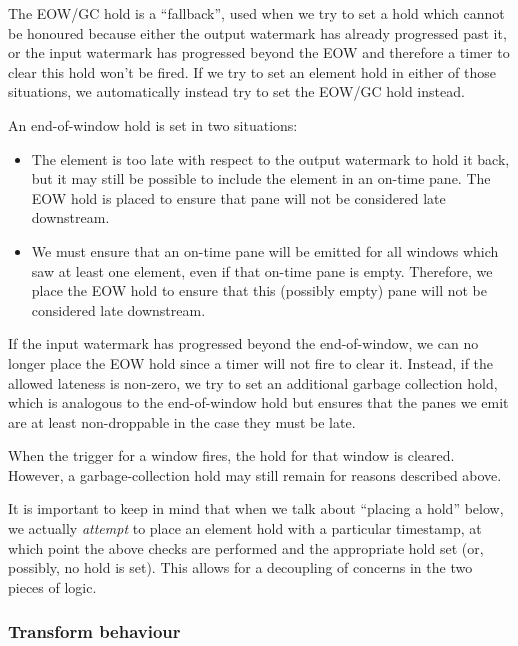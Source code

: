 
The EOW/GC hold is a ``fallback'', used when we try to set a hold which cannot be honoured because either the output watermark has already progressed past it, or the input watermark has progressed beyond the EOW and therefore a timer to clear this hold won't be fired.
If we try to set an element hold in either of those situations, we automatically instead try to set the EOW/GC hold instead.

An end-of-window hold is set in two situations:
\begin{itemize}
	\item The element is too late with respect to the output watermark to hold it back, but it may still be possible to include the element in an on-time pane.
	The EOW hold is placed to ensure that pane will not be considered late downstream.
	\item We must ensure that an on-time pane will be emitted for all windows which saw at least one element, even if that on-time pane is empty.
	Therefore, we place the EOW hold to ensure that this (possibly empty) pane will not be considered late downstream.
\end{itemize}

If the input watermark has progressed beyond the end-of-window, we can no longer place the EOW hold since a timer will not fire to clear it.
Instead, if the allowed lateness is non-zero, we try to set an additional garbage collection hold, which is analogous to the end-of-window hold but ensures that the panes we emit are at least non-droppable in the case they must be late.

When the trigger for a window fires, the hold for that window is cleared.
However, a garbage-collection hold may still remain for reasons described above.

It is important to keep in mind that when we talk about ``placing a hold'' below, we actually \emph{attempt} to place an element hold with a particular timestamp, at which point the above checks are performed and the appropriate hold set (or, possibly, no hold is set).
This allows for a decoupling of concerns in the two pieces of logic.


\subsubsection{Transform behaviour}

